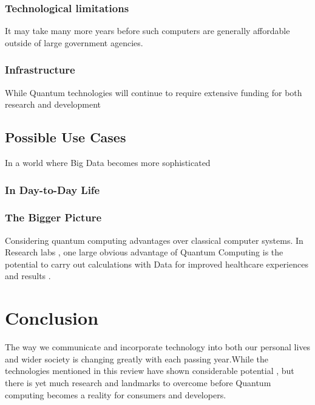 \documentclass[journal]{IEEEtran}
\begin{document}
\subsubsection{Technological limitations  }
It may take many more years before such computers are generally affordable outside of large government agencies.

\subsubsection{Infrastructure}


While Quantum technologies will continue to require extensive funding for both research and development 
\subsection{Possible Use Cases}
In a world where Big Data becomes more sophisticated 

\subsubsection{In Day-to-Day  Life}


\subsubsection{The Bigger Picture}
Considering quantum computing   advantages over classical computer systems. 
In Research labs  , one large  obvious advantage of Quantum Computing is the potential to carry out calculations with  Data for improved healthcare
experiences and results .


\section{Conclusion}
The way we communicate and incorporate technology into both our personal lives and wider society is changing greatly with each passing year.While the technologies mentioned in this review have shown considerable potential , but there is yet much research and landmarks to overcome before Quantum computing becomes a reality for consumers and developers.

\bigskip
\bigskip

\printbibliography
\end{document}
